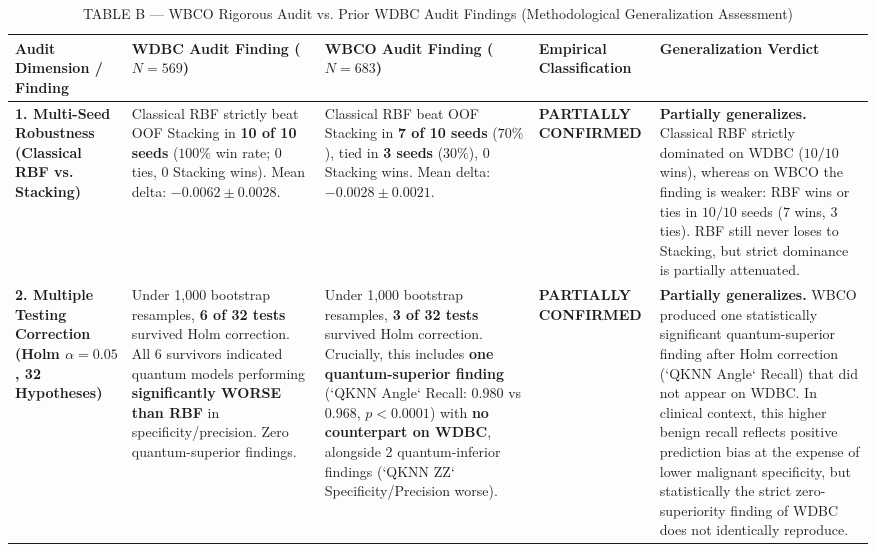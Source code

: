 \documentclass[journal,twocolumn]{IEEEtran}
\begin{document}
\begin{table}[t]
\centering
\caption{TABLE B — WBCO Rigorous Audit vs. Prior WDBC Audit Findings (Methodological Generalization Assessment)}
\label{tab:table_b_generalization}
\footnotesize
\begin{tabularx}{\textwidth}{p{}p{}p{}p{}X}
\toprule
\textbf{Audit Dimension / Finding} & \textbf{WDBC Audit Finding ($N=569$)} & \textbf{WBCO Audit Finding ($N=683$)} & \textbf{Empirical Classification} & \textbf{Generalization Verdict} \\
\midrule
\textbf{1. Multi-Seed Robustness (Classical RBF vs. Stacking)} & Classical RBF strictly beat OOF Stacking in \textbf{10 of 10 seeds} ($100\%$ win rate; 0 ties, 0 Stacking wins). Mean delta: $-0.0062 \pm 0.0028$. & Classical RBF beat OOF Stacking in \textbf{7 of 10 seeds} ($70\%$), tied in \textbf{3 seeds} ($30\%$), 0 Stacking wins. Mean delta: $-0.0028 \pm 0.0021$. & \textbf{PARTIALLY CONFIRMED} & \textbf{Partially generalizes.} Classical RBF strictly dominated on WDBC ($10/10$ wins), whereas on WBCO the finding is weaker: RBF wins or ties in $10/10$ seeds ($7$ wins, $3$ ties). RBF still never loses to Stacking, but strict dominance is partially attenuated. \\
\midrule
\textbf{2. Multiple Testing Correction (Holm $\alpha=0.05$, 32 Hypotheses)} & Under 1,000 bootstrap resamples, \textbf{6 of 32 tests} survived Holm correction. All 6 survivors indicated quantum models performing \textbf{significantly WORSE than RBF} in specificity/precision. Zero quantum-superior findings. & Under 1,000 bootstrap resamples, \textbf{3 of 32 tests} survived Holm correction. Crucially, this includes \textbf{one quantum-superior finding} (`QKNN Angle` Recall: $0.980$ vs $0.968$, $p < 0.0001$) with \textbf{no counterpart on WDBC}, alongside 2 quantum-inferior findings (`QKNN ZZ` Specificity/Precision worse). & \textbf{PARTIALLY CONFIRMED} & \textbf{Partially generalizes.} WBCO produced one statistically significant quantum-superior finding after Holm correction (`QKNN Angle` Recall) that did not appear on WDBC. In clinical context, this higher benign recall reflects positive prediction bias at the expense of lower malignant specificity, but statistically the strict zero-superiority finding of WDBC does not identically reproduce. \\
\midrule

\end{tabularx}
\end{table}
\end{document}
